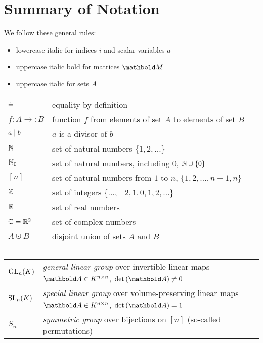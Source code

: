 
\chapter{Summary of Notation}

\begin{fullwidth}
We follow these general rules: \begin{itemize}[noitemsep]
    \item lowercase italic for indices $i$ and scalar variables $a$
    \item uppercase italic bold for matrices $\mM$
    \item uppercase italic for sets $A$
\end{itemize}

\emptyparagraph\begin{tabular}{p{2cm}l}
    $\overset{.}{=}$ & equality by definition \\
    $f : A \to : B$ & function $f$ from elements of set $A$ to elements of set $B$ \\
    $a \mid b$ & $a$ is a divisor of $b$ \\
    $\mathbb{N}$ & set of natural numbers $\{1, 2, \dots\}$ \\
    $\mathbb{N}_0$ & set of natural numbers, including $0$, $\mathbb{N} \cup \{0\}$ \\
    $[n]$ & set of natural numbers from $1$ to $n$, $\{1, 2, \dots, n-1, n\}$ \\
    $\mathbb{Z}$ & set of integers $\{\dots, -2, 1, 0, 1, 2, \dots\}$ \\
    $\mathbb{R}$ & set of real numbers \\
    $\mathbb{C} = \mathbb{R}^2$ & set of complex numbers \\
    $A \cupdot B$ & disjoint union of sets $A$ and $B$ \\
\end{tabular}

\section*{}
\emptyparagraph\begin{tabular}{p{2cm}l}
    $\mathrm{GL}_{n}(K)$ & \emph{general linear group} over invertible linear maps $\mA \in K^{n \times n}$, $\determ{\mA} \neq 0$ \\
    $\mathrm{SL}_{n}(K)$ & \emph{special linear group} over volume-preserving linear maps $\mA \in K^{n \times n}$, $\determ{\mA} = 1$ \\
    $S_n$ & \emph{symmetric group} over bijections on $[n]$ (so-called permutations) \\
\end{tabular}
\end{fullwidth}

